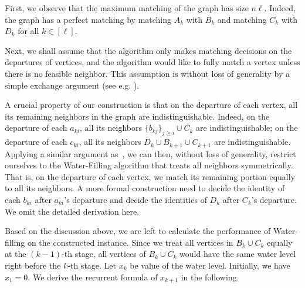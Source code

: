First, we observe that the maximum matching of the graph has size $n\ell$. Indeed, the graph has a perfect matching by matching $A_k$ with $B_k$ and matching $C_k$ with $D_k$ for all $k \in [\ell]$.

Next, we shall assume that the algorithm only makes matching decisions on the departures of vertices, and the algorithm would like to fully match a vertex unless there is no feasible neighbor. This assumption is without loss of generality by a simple exchange argument (see e.g. \cite{jacm/HuangKTWZZ20}).

A crucial property of our construction is that on the departure of each vertex, all its remaining neighbors in the graph are indistinguishable. Indeed, on the departure of each $a_{ki}$, all its neighbors $\{b_{kj}\}_{j \ge i} \cup C_k$ are indistinguishable; on the departure of each $c_{ki}$, all its neighbors $D_k \cup B_{k+1} \cup C_{k+1}$ are indistinguishable. 
Applying a similar argument as~\cite{orl/EcklKLS21}, we can then, without loss of generality, restrict ourselves to the Water-Filling algorithm that treats all neighbors symmetrically. That is, on the departure of each vertex, we match its remaining portion equally to all its neighbors. A more formal construction need to decide the identity of each $b_{ki}$ after $a_{ki}$'s departure and decide the identities of $D_k$ after $C_k$'s departure. We omit the detailed derivation here.

Based on the discussion above, we are left to calculate the performance of Water-filling on the constructed instance. Since we treat all vertices in $B_k \cup C_k$ equally at the $(k-1)$-th stage, all vertices of $B_k \cup C_k$ would have the same water level right before the $k$-th stage. Let $x_{k}$ be value of the water level. Initially, we have $x_1 = 0$. We derive the recurrent formula of $x_{k+1}$ in the following.


